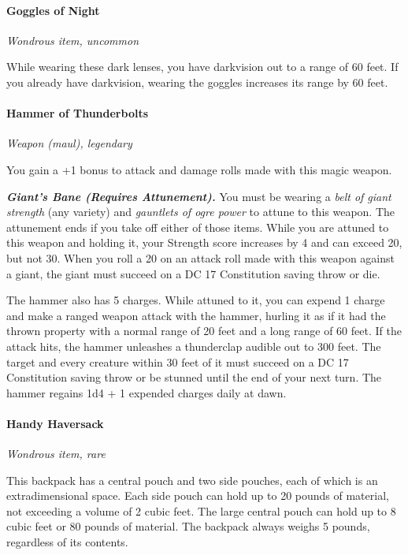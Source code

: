 \documentclass[
]{article}
\begin{document}
\hypertarget{goggles-of-night}{%
\paragraph{Goggles of Night}\label{goggles-of-night}}

\emph{Wondrous item, uncommon}

While wearing these dark lenses, you have darkvision out to a range of
60 feet. If you already have darkvision, wearing the goggles increases
its range by 60 feet.

\hypertarget{hammer-of-thunderbolts}{%
\paragraph{Hammer of Thunderbolts}\label{hammer-of-thunderbolts}}

\emph{Weapon (maul), legendary}

You gain a +1 bonus to attack and damage rolls made with this magic
weapon.

\emph{\textbf{Giant's Bane (Requires Attunement).}} You must be wearing
a \emph{belt of giant strength} (any variety) and \emph{gauntlets of
ogre power} to attune to this weapon. The attunement ends if you take
off either of those items. While you are attuned to this weapon and
holding it, your Strength score increases by 4 and can exceed 20, but
not 30. When you roll a 20 on an attack roll made with this weapon
against a giant, the giant must succeed on a DC 17 Constitution saving
throw or die.

The hammer also has 5 charges. While attuned to it, you can expend 1
charge and make a ranged weapon attack with the hammer, hurling it as if
it had the thrown property with a normal range of 20 feet and a long
range of 60 feet. If the attack hits, the hammer unleashes a thunderclap
audible out to 300 feet. The target and every creature within 30 feet of
it must succeed on a DC 17 Constitution saving throw or be stunned until
the end of your next turn. The hammer regains 1d4 + 1 expended charges
daily at dawn.

\hypertarget{handy-haversack}{%
\paragraph{Handy Haversack}\label{handy-haversack}}

\emph{Wondrous item, rare}

This backpack has a central pouch and two side pouches, each of which is
an extradimensional space. Each side pouch can hold up to 20 pounds of
material, not exceeding a volume of 2 cubic feet. The large central
pouch can hold up to 8 cubic feet or 80 pounds of material. The backpack
always weighs 5 pounds, regardless of its contents.
\end{document}
